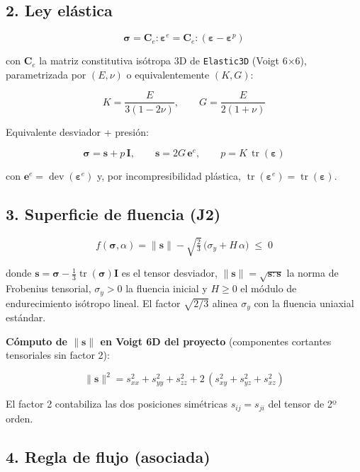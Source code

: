 \documentclass[11pt,letterpaper,oneside]{report}
\begin{document}
\subsection{2. Ley elástica}

\[
\boldsymbol\sigma = \mathbf C_e : \boldsymbol\varepsilon^e = \mathbf C_e : (\boldsymbol\varepsilon - \boldsymbol\varepsilon^p)
\]

con $\mathbf C_e$ la matriz constitutiva isótropa 3D de \texttt{Elastic3D} (Voigt 6\ensuremath{\times}6), parametrizada por $(E, \nu)$ o equivalentemente $(K, G)$:

\[
K = \frac{E}{3(1-2\nu)}, \qquad G = \frac{E}{2(1+\nu)}
\]

Equivalente desviador + presión:

\[
\boldsymbol\sigma = \mathbf s + p\,\mathbf I, \qquad \mathbf s = 2G\,\mathbf e^e, \qquad p = K\,\operatorname{tr}(\boldsymbol\varepsilon)
\]

con $\mathbf e^e = \operatorname{dev}(\boldsymbol\varepsilon^e)$ y, por incompresibilidad plástica, $\operatorname{tr}(\boldsymbol\varepsilon^e) = \operatorname{tr}(\boldsymbol\varepsilon)$.

\subsection{3. Superficie de fluencia (J2)}

\[
f(\boldsymbol\sigma, \alpha) = \|\mathbf s\| - \sqrt{\tfrac{2}{3}}\,\big(\sigma_y + H\,\alpha\big) \;\leq\; 0
\]

donde $\mathbf s = \boldsymbol\sigma - \tfrac{1}{3}\operatorname{tr}(\boldsymbol\sigma)\mathbf I$ es el tensor desviador, $\|\mathbf s\| = \sqrt{\mathbf s : \mathbf s}$ la norma de Frobenius tensorial, $\sigma_y > 0$ la fluencia inicial y $H \geq 0$ el módulo de endurecimiento isótropo lineal. El factor $\sqrt{2/3}$ alinea $\sigma_y$ con la fluencia uniaxial estándar.

\textbf{Cómputo de $\|\mathbf s\|$ en Voigt 6D del proyecto} (componentes cortantes tensoriales sin factor 2):

\[
\|\mathbf s\|^2 = s_{xx}^2 + s_{yy}^2 + s_{zz}^2 + 2\,(s_{xy}^2 + s_{yz}^2 + s_{xz}^2)
\]

El factor 2 contabiliza las dos posiciones simétricas $s_{ij} = s_{ji}$ del tensor de 2º orden.

\subsection{4. Regla de flujo (asociada)}
\end{document}
